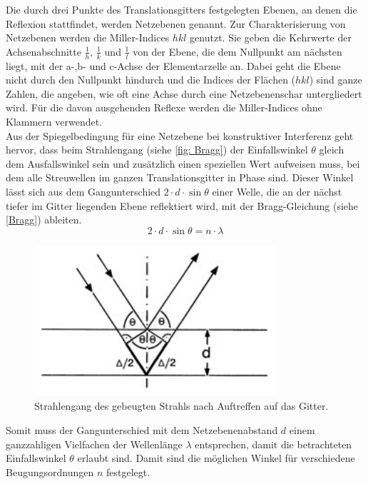 \documentclass[a4paper,12pt,bibliography=totocnumbered]{scrartcl}
\begin{document}
Die durch drei Punkte des Translationsgitters festgelegten Ebenen, an denen die Reflexion stattfindet, werden Netzebenen genannt. Zur Charakterisierung von Netzebenen werden die Miller-Indices $hkl$ genutzt. Sie geben die Kehrwerte der Achsenabschnitte $\frac{1}{h}$, $\frac{1}{k}$ und $\frac{1}{l}$ von der Ebene, die dem Nullpunkt am nächsten liegt, mit der a-,b- und c-Achse der Elementarzelle an. Dabei geht die Ebene nicht durch den Nullpunkt hindurch und die Indices der Flächen ($hkl$) sind ganze Zahlen, die angeben, wie oft eine Achse durch eine Netzebenenschar untergliedert wird. Für die davon ausgehenden Reflexe werden die Miller-Indices ohne Klammern verwendet. \\
Aus der Spiegelbedingung für eine Netzebene bei konstruktiver Interferenz geht hervor, dass beim Strahlengang (siehe \autoref{fig: Bragg}) der Einfallswinkel $\theta$ gleich dem Ausfallswinkel sein und zusätzlich einen speziellen Wert aufweisen muss, bei dem alle Streuwellen im ganzen Translationsgitter in Phase sind. Dieser Winkel lässt sich aus dem Gangunterschied $2 \cdot d \cdot \sin \theta$ einer Welle, die an der nächst tiefer im Gitter liegenden Ebene reflektiert wird, mit der Bragg-Gleichung (siehe \autoref{Bragg}) ableiten. 
\begin{equation}
    2 \cdot d \cdot \sin \theta = n \cdot \lambda
    \label{Bragg}
\end{equation}

\begin{figure}[H]
    \centering
    \includegraphics[scale=0.95]{Bilder/Bragg.png}
    \caption{Strahlengang des gebeugten Strahls nach Auftreffen auf das Gitter. \cite{Kristallgitter}}
    \label{fig: Bragg}
\end{figure}
Somit muss der Gangunterschied mit dem Netzebenenabstand $d$ einem  ganzzahligen Vielfachen der Wellenlänge $\lambda$ entsprechen, damit die betrachteten Einfallswinkel $\theta$ erlaubt sind.
Damit sind die möglichen Winkel für verschiedene Beugungsordnungen $n$ festgelegt.
\end{document}
